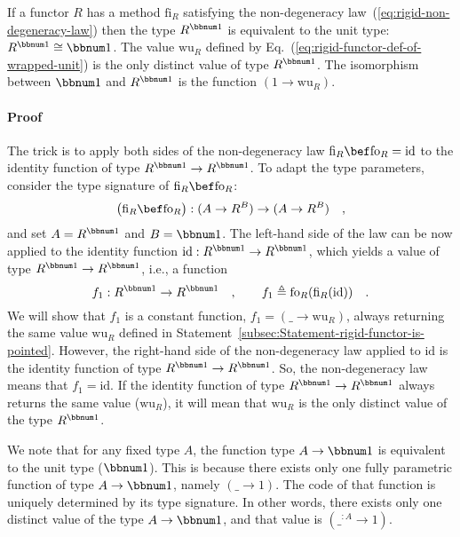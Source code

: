 If a functor $R$ has a method $\text{fi}_{R}$ satisfying the non-degeneracy
law~(\ref{eq:rigid-non-degeneracy-law}) then the type $R^{\bbnum 1}$
is equivalent to the unit type: $R^{\bbnum 1}\cong\bbnum 1$. The
value $\text{wu}_{R}$ defined by Eq.~(\ref{eq:rigid-functor-def-of-wrapped-unit})
is the only distinct value of type $R^{\bbnum 1}$. The isomorphism
between $\bbnum 1$ and $R^{\bbnum 1}$ is the function $\left(1\rightarrow\text{wu}_{R}\right)$.

\paragraph{Proof}

The trick is to apply both sides of the non-degeneracy law $\text{fi}_{R}\bef\text{fo}_{R}=\text{id}$
to the identity function of type $R^{\bbnum 1}\rightarrow R^{\bbnum 1}$.
To adapt the type parameters, consider the type signature of $\text{fi}_{R}\bef\text{fo}_{R}$:
\[
\big(\text{fi}_{R}\bef\text{fo}_{R}\big):(A\rightarrow R^{B})\rightarrow(A\rightarrow R^{B})\quad,
\]
and set $A=R^{\bbnum 1}$ and $B=\bbnum 1$. The left-hand side of
the law can be now applied to the identity function $\text{id}:R^{\bbnum 1}\rightarrow R^{\bbnum 1}$,
which yields a value of type $R^{\bbnum 1}\rightarrow R^{\bbnum 1}$,
i.e., a function 
\[
f_{1}:R^{\bbnum 1}\rightarrow R^{\bbnum 1}\quad,\quad\quad f_{1}\triangleq\text{fo}_{R}(\text{fi}_{R}(\text{id}))\quad.
\]
We will show that $f_{1}$ is a constant function, $f_{1}=(\_\rightarrow\text{wu}_{R})$,
always returning the same value $\text{wu}_{R}$ defined in Statement~\ref{subsec:Statement-rigid-functor-is-pointed}.
However, the right-hand side of the non-degeneracy law applied to
$\text{id}$ is the identity function of type $R^{\bbnum 1}\rightarrow R^{\bbnum 1}$.
So, the non-degeneracy law means that $f_{1}=\text{id}$. If the identity
function of type $R^{\bbnum 1}\rightarrow R^{\bbnum 1}$ always returns
the same value ($\text{wu}_{R}$), it will mean that $\text{wu}_{R}$
is the only distinct value of the type $R^{\bbnum 1}$.

We note that for any fixed type $A$, the function type $A\rightarrow\bbnum 1$
is equivalent to the unit type ($\bbnum 1$). This is because there
exists only one fully parametric function of type $A\rightarrow\bbnum 1$,
namely $(\_\rightarrow1)$. The code of that function is uniquely
determined by its type signature. In other words, there exists only
one distinct value of the type $A\rightarrow\bbnum 1$, and that value
is $(\_^{:A}\rightarrow1)$. 

